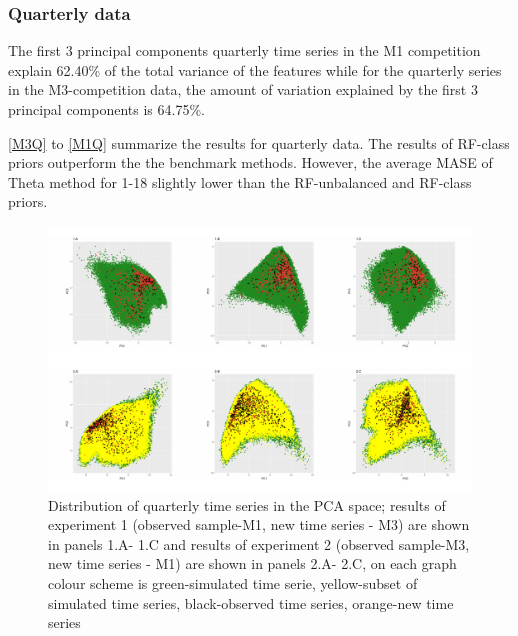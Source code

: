 \documentclass[11pt,]{article}
\theoremstyle{definition}
\theoremstyle{definition}
\theoremstyle{definition}
\theoremstyle{remark}
\begin{document}
\subsubsection{Quarterly data}\label{quarterly-data}

The first 3 principal components quarterly time series in the M1
competition explain 62.40\% of the total variance of the features while
for the quarterly series in the M3-competition data, the amount of
variation explained by the first 3 principal components is 64.75\%.

\autoref{M3Q} to \autoref{M1Q} summarize the results for quarterly data.
The results of RF-class priors outperform the the benchmark methods.
However, the average MASE of Theta method for 1-18 slightly lower than
the RF-unbalanced and RF-class priors.

\begin{figure}

{\centering \includegraphics[width=\textwidth]{figure/pca2-1} 

}

\caption{Distribution of quarterly time series in the PCA space; results of experiment 1 (observed sample-M1, new time series - M3) are shown in panels 1.A- 1.C and results of experiment 2 (observed sample-M3, new time series - M1) are shown in panels 2.A- 2.C, on each graph colour scheme is green-simulated time serie, yellow-subset of simulated time series, black-observed time series, orange-new time series}\label{fig:pca2}
\end{figure}
\end{document}
